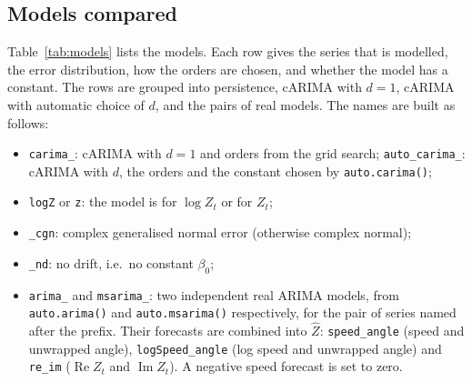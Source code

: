 \documentclass[11pt,a4paper]{article}
\newcommand{\code}[1]{\texttt{#1}}
\renewcommand{\Re}{\operatorname{Re}}
\renewcommand{\Im}{\operatorname{Im}}
\begin{document}
\subsection{Models compared}

Table~\ref{tab:models} lists the models. Each row gives the series that is modelled, the error
distribution, how the orders are chosen, and whether the model has a constant. The rows are
grouped into persistence, cARIMA with $d = 1$, cARIMA with automatic choice of $d$, and the pairs
of real models. The names are built as follows:
\begin{itemize}
  \item \code{carima\_}: cARIMA with $d = 1$ and orders from the grid search;
    \code{auto\_carima\_}: cARIMA with $d$, the orders and the constant chosen by
    \code{auto.carima()};
  \item \code{logZ} or \code{z}: the model is for $\log Z_t$ or for $Z_t$;
  \item \code{\_cgn}: complex generalised normal error (otherwise complex normal);
  \item \code{\_nd}: no drift, i.e.\ no constant $\beta_0$;
  \item \code{arima\_} and \code{msarima\_}: two independent real ARIMA models, from
    \code{auto.arima()} and \code{auto.msarima()} respectively, for the pair of series named after
    the prefix. Their forecasts are combined into $\hat Z$:
    \code{speed\_angle} (speed and unwrapped angle),
    \code{logSpeed\_angle} (log speed and unwrapped angle) and
    \code{re\_im} ($\Re Z_t$ and $\Im Z_t$).
    A negative speed forecast is set to zero.
\end{itemize}
\end{document}
